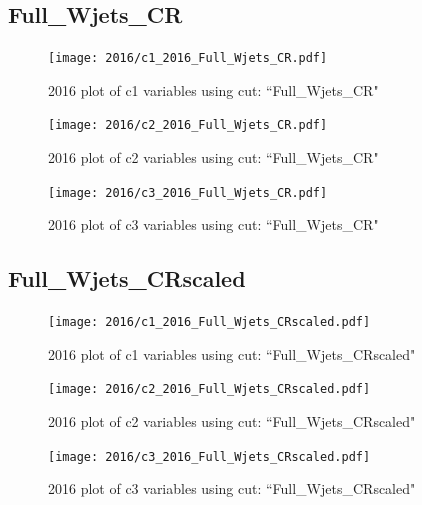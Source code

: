\documentclass{article}
\begin{document}
      \subsection*{Full\_Wjets\_CR}
                        \begin{figure}[H]
                            \centering
                            \caption{2016 plot of c1 variables using cut: ``Full\_Wjets\_CR"}
                            \texttt{[image: 2016/c1\_2016\_Full\_Wjets\_CR.pdf]}
                        \end{figure}    
                        \begin{figure}[H]
                            \centering
                            \caption{2016 plot of c2 variables using cut: ``Full\_Wjets\_CR"}
                            \texttt{[image: 2016/c2\_2016\_Full\_Wjets\_CR.pdf]}
                        \end{figure}    
                        \begin{figure}[H]
                            \centering
                            \caption{2016 plot of c3 variables using cut: ``Full\_Wjets\_CR"}
                            \texttt{[image: 2016/c3\_2016\_Full\_Wjets\_CR.pdf]}
                        \end{figure}    
      \subsection*{Full\_Wjets\_CRscaled}
                        \begin{figure}[H]
                            \centering
                            \caption{2016 plot of c1 variables using cut: ``Full\_Wjets\_CRscaled"}
                            \texttt{[image: 2016/c1\_2016\_Full\_Wjets\_CRscaled.pdf]}
                        \end{figure}    
                        \begin{figure}[H]
                            \centering
                            \caption{2016 plot of c2 variables using cut: ``Full\_Wjets\_CRscaled"}
                            \texttt{[image: 2016/c2\_2016\_Full\_Wjets\_CRscaled.pdf]}
                        \end{figure}    
                        \begin{figure}[H]
                            \centering
                            \caption{2016 plot of c3 variables using cut: ``Full\_Wjets\_CRscaled"}
                            \texttt{[image: 2016/c3\_2016\_Full\_Wjets\_CRscaled.pdf]}
                        \end{figure}    
\end{document}
